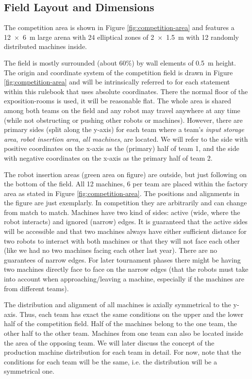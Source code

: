 \documentclass[12pt,twoside]{article}
\begin{document}
\subsection{Field Layout and Dimensions}
\label{sec:competition-area}

The competition area is shown in Figure \ref{fig:competition-area} and
features a \SI{12 x 6}{\metre} large arena with 24 elliptical zones of \SI{2 x 1.5}{\metre}
with 12 randomly distributed machines inside.

The field is mostly surrounded (about 60\%) by wall elements of \SI{0.5}{\metre} height.
The origin and coordinate system of the competition field is drawn in
Figure \ref{fig:competition-area} and will be intrinsically referred
to for each statement within this rulebook that uses absolute coordinates.
There the normal floor of the exposition-rooms is used, it will be reasonable flat.
The whole area is shared among both teams on the field and any robot
may travel anywhere at any time (while not obstructing or pushing
other robots or machines). However, there are primary sides (split
along the y-axis) for each team where a team's \textit{input storage
  area}, \textit{robot insertion area}, \textit{all machines},
 are located. We will refer to the side with positive coordinates on the x-axis as the
(primary) half of team 1, and the side with negative coordinates on
the x-axis as the primary half of team 2.

The robot insertion areas (green area on figure) are outside, but just following on the
bottom of the field.
All 12 machines, 6 per team are placed within the factory area as stated in Figure
\ref{fig:competition-area}.
The positions and alignments in the figure are just exemplarly.
In competition they are arbitrarily and can change from match to match.
Machines have two kind of sides: active (wide, where the robot
interacts) and ignored (narrow) edges.
It is guaranteed that the active sides will be accessible and that 
two machines always have either sufficient distance for two robots to interact 
with both machines or that they will not face each other (like we had no two 
machines facing each other last year). There are no guarantees of narrow edges. 
For later tournament phases there might be having two machines directly face to 
face on the narrow edges (that the robots must take into account when 
approaching/leaving a machine, especially if the machines are from different teams).

The distribution and alignment of all machines is axially symmetrical
to the y-axis. Thus, each team has exact the same conditions on the
upper and the lower half of the competition field. Half of the 
machines belong to the one team, the other
half to the other team. Machines from one team can also be located inside
the area of the opposing team. We will later discuss the concept of
the production machine distribution for each team in detail. For now,
note that the conditions for each team will be the same, i.e. the
distribution will be a symmetrical one.
\end{document}
